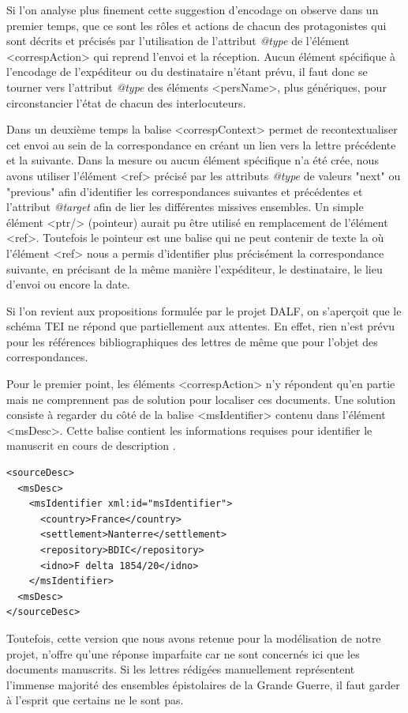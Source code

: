 \documentclass[12pt,a4paper]{book} %
\begin{document}
Si l'on analyse plus finement cette suggestion d'encodage on observe dans un premier temps, que ce sont les rôles et actions de chacun des protagonistes qui sont décrits et précisés par l'utilisation de l'attribut \textit{@type} de l'élément <correspAction> qui reprend l'envoi et la réception. Aucun élément spécifique à l'encodage de l'expéditeur ou du destinataire n'étant prévu, il faut donc se tourner vers l'attribut \textit{@type} des éléments <persName>, plus génériques, pour circonstancier l'état de chacun des interlocuteurs.

Dans un deuxième temps la balise <correspContext> permet de recontextualiser cet envoi au sein de la correspondance en créant un lien vers la lettre précédente et la suivante. Dans la mesure ou aucun élément spécifique n'a été crée, nous avons utiliser l'élément <ref> précisé par les attributs \textit{@type} de valeurs "next" ou "previous" afin d'identifier les correspondances suivantes et précédentes et l'attribut \textit{@target} afin  de lier les différentes missives ensembles. Un simple élément <ptr/> (pointeur) aurait pu être utilisé en remplacement de l'élément <ref>. Toutefois le pointeur est une balise qui ne peut contenir de texte la où l'élément <ref> nous a permis d'identifier plus précisément la correspondance suivante, en précisant de la même manière l'expéditeur, le destinataire, le lieu d'envoi ou encore la date.

\medskip
Si l'on revient aux propositions formulée par le projet DALF, on s'aperçoit que le schéma TEI ne répond que partiellement aux attentes. En effet, rien n'est prévu pour les références bibliographiques des lettres de même que pour l'objet des correspondances.

Pour le premier point, les éléments <correspAction> n'y répondent qu'en partie mais ne comprennent pas de solution pour localiser ces documents. Une solution consiste à regarder du côté de la balise <msIdentifier> contenu dans l'élément <msDesc>. Cette balise \og contient les informations requises pour identifier le manuscrit en cours de description \fg{}. 
\bigskip

\begin{lstlisting}
<sourceDesc>
  <msDesc>
    <msIdentifier xml:id="msIdentifier">
      <country>France</country>
      <settlement>Nanterre</settlement>
      <repository>BDIC</repository>
      <idno>F delta 1854/20</idno>
    </msIdentifier>
  <msDesc>
</sourceDesc>
\end{lstlisting}
\bigskip

Toutefois, cette version que nous avons retenue pour la modélisation de notre projet, n'offre qu'une réponse imparfaite car ne sont concernés ici que les documents manuscrits. Si les lettres rédigées manuellement représentent l'immense majorité des ensembles épistolaires de la Grande Guerre, il faut garder à l'esprit que certains ne le sont pas.
\end{document}
